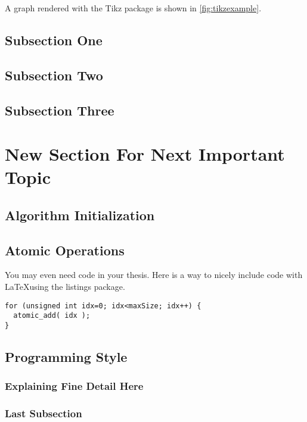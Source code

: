 A graph rendered with the Tikz package is shown in \autoref{fig:tikzexample}.

\subsection{Subsection One}
\subsection{Subsection Two}
\subsection{Subsection Three}

\section{New Section For Next Important Topic}

\subsection{Algorithm Initialization}
\subsection{Atomic Operations}

You may even need code in your thesis. Here is a way to nicely include code with \LaTeX using the listings package.
{\singlespace
\begin{lstlisting}
for (unsigned int idx=0; idx<maxSize; idx++) {
  atomic_add( idx );
}
\end{lstlisting}
}

\subsection{Programming Style}
\subsubsection{Explaining Fine Detail Here}


\subsubsection{Last Subsection}
